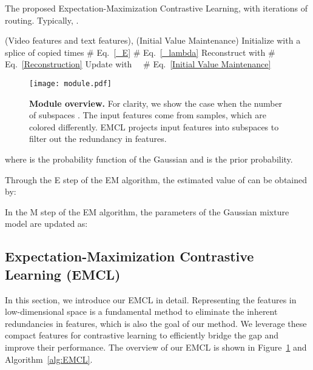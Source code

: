 \documentclass{article}
\begin{document}
\begin{minipage}{0.57\textwidth}
\begin{algorithm}[H]\small
\small
\caption{\small{The proposed Expectation-Maximization Contrastive Learning, with  iterations of routing. Typically, .}}
\label{alg:EMCL}
\begin{algorithmic}[1]
\REQUIRE  (Video features and text features),  (Initial Value Maintenance)
\STATE Initialize  with a splice of  copied  times
\STATE   
\FOR{}
\STATE    \# Eq.~\eqref{_E}
\ENDFOR
\STATE   
{}
\STATE   \quad \quad \quad \quad \quad \quad \quad \quad \# Eq.~\eqref{_lambda}
\ENDFOR
\ENDFOR 
\STATE Reconstruct  with   \quad \quad  \# Eq.~\eqref{Reconstruction}
\STATE Update  with  \quad \quad \ \ \# Eq.~\eqref{Initial Value Maintenance}
\RETURN 
\end{algorithmic}
\end{algorithm}
\vspace{0.em}
\end{minipage}
\hfill
\begin{minipage}{0.4\textwidth}
\begin{figure}[H]
\centering
\texttt{[image: module.pdf]}
\vspace{-1.5em}
\caption{\textbf{Module overview.} For clarity, we show the case when the number of subspaces . The input features come from  samples, which are colored differently. EMCL projects input features into  subspaces to filter out the redundancy in features.}
\label{fig00}
\end{figure}
\vspace{0.em}
\end{minipage}

where  is the probability function of the  Gaussian and  is the prior probability.

Through the E step of the EM algorithm, the estimated value of  can be obtained by:


In the M step of the EM algorithm, the parameters of the Gaussian mixture model are updated as:



\subsection{Expectation-Maximization Contrastive Learning (EMCL)} \label{assumptions1}

In this section, we introduce our EMCL in detail.
Representing the features in low-dimensional space is a fundamental method to eliminate the inherent redundancies in features, which is also the goal of our method. We leverage these compact features for contrastive learning to efficiently bridge the gap and improve their performance. The overview of our EMCL is shown in Figure~\ref{fig00} and Algorithm~\ref{alg:EMCL}.
\end{document}
